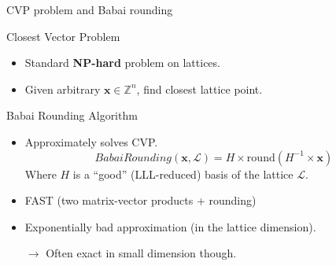 \begin{frame}{CVP problem and Babai rounding}
  \begin{alertblock}{Closest Vector Problem}
    \begin{itemize}
    \item Standard \textbf{NP-hard} problem on lattices.
    \item Given arbitrary $\mathbf{x} \in \mathbb{Z}^n$, find closest lattice point.
  \end{itemize}
\end{alertblock}

\medskip

\begin{block}{Babai Rounding Algorithm}
      \begin{itemize}
      \item Approximately solves CVP.
        \[
          BabaiRounding(\mathbf{x}, \mathcal{L}) = H\times \mathrm{round}\left(H^{-1}\times \mathbf{x}\right)
        \]
        Where \(H\) is a ``good'' (LLL-reduced) basis of the lattice $\mathcal{L}$.

      \item FAST (two matrix-vector products + rounding)
      \item Exponentially bad approximation (in the lattice dimension).
      \item[$\rightarrow$] Often exact in small dimension though.
      \end{itemize}
    \end{block}    
\end{frame}



